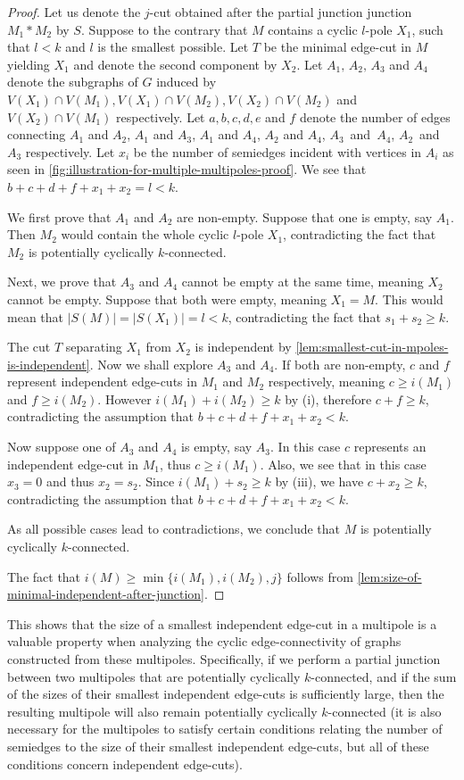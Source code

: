 \documentclass[12pt, twoside]{book}
\begin{document}
\begin{proof}
	Let us denote the $j$-cut obtained after the partial junction junction $M_1*M_2$ by $S$. Suppose to the contrary that $M$ contains a cyclic $l$-pole $X_1$, such that $l<k$ and $l$ is the smallest possible. Let $T$ be the minimal edge-cut in $M$ yielding $X_1$ and denote the second component by $X_2$. Let $A_1,\,A_2,\,A_3$ and $A_4$ denote the subgraphs of $G$ induced by ${V(X_1)\cap V(M_1)}, {V(X_1)\cap V(M_2)}, {V(X_2)\cap V(M_2)}$ and ${V(X_2)\cap V(M_1)}$ respectively. Let $a,b,c,d,e$ and $f$ denote the number of edges connecting $A_1$ and $A_2$, $A_1$ and $A_3$, $A_1$ and $A_4$, $A_2$ and $A_4$, $A_3$~and~$A_4$, $A_2$~and~$A_3$ respectively. Let $x_i$ be the number of semiedges incident with vertices in $A_i$ as seen in \cref{fig:illustration-for-multiple-multipoles-proof}. We see that ${b+c+d+f+x_1+x_2=l<k}$.
	
	We first prove that $A_1$ and $A_2$ are non-empty. Suppose that one is empty, say $A_1$. Then $M_2$ would contain the whole cyclic $l$-pole $X_1$, contradicting the fact that $M_2$ is potentially cyclically $k$-connected.
	
	Next, we prove that $A_3$ and $A_4$ cannot be empty at the same time, meaning $X_2$ cannot be empty. Suppose that both were empty, meaning $X_1=M$. This would mean that $|S(M)|=|S(X_1)|=l<k$, contradicting the fact that $s_1+s_2\geq k$.
	
	The cut $T$ separating $X_1$ from $X_2$ is independent by \cref{lem:smallest-cut-in-mpoles-is-independent}. Now we shall explore $A_3$ and $A_4$. If both are non-empty, $c$ and $f$ represent independent edge-cuts in $M_1$ and $M_2$ respectively, meaning ${c\geq i(M_1)}$ and ${f\geq i(M_2)}$. However ${i(M_1)+i(M_2)\geq k}$ by (i), therefore $c+f\geq k$, contradicting the assumption that ${b+c+d+f+x_1+x_2<k}$.
	
	Now suppose one of $A_3$ and $A_4$ is empty, say $A_3$. In this case $c$ represents an independent edge-cut in $M_1$, thus $c\geq i(M_1)$. Also, we see that in this case $x_3=0$ and thus $x_2=s_2$. Since $i(M_1)+s_2\geq k$ by (iii), we have $c+x_2\geq k$, contradicting the assumption that ${b+c+d+f+x_1+x_2<k}$.
	
	As all possible cases lead to contradictions, we conclude that $M$ is potentially cyclically \mbox{$k$-connected}.
	
	The fact that ${i(M)\geq \min\{i(M_1), i(M_2), j\}}$ follows from \cref{lem:size-of-minimal-independent-after-junction}.
\end{proof}

This shows that the size of a smallest independent edge-cut in a multipole is a valuable property when analyzing the cyclic edge-connectivity of graphs constructed from these multipoles. Specifically, if we perform a partial junction between two multipoles that are potentially cyclically $k$-connected, and if the sum of the sizes of their smallest independent edge-cuts is sufficiently large, then the resulting multipole will also remain potentially cyclically $k$-connected (it is also necessary for the multipoles to satisfy certain conditions relating the number of semiedges to the size of their smallest independent edge-cuts, but all of these conditions concern independent edge-cuts).
\end{document}
